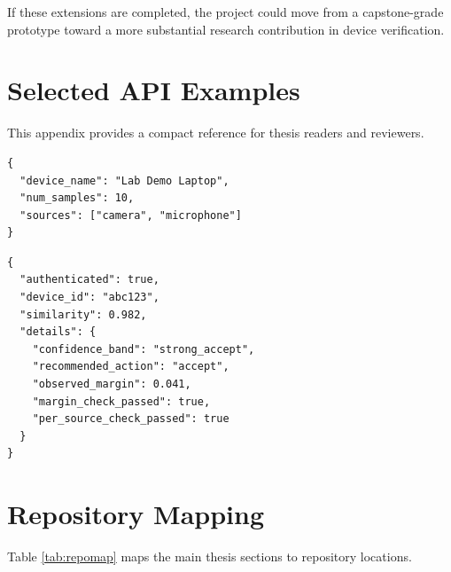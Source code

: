\documentclass[12pt]{report}
\begin{document}
If these extensions are completed, the project could move from a capstone-grade prototype toward a more substantial research contribution in device verification.

\appendix

\chapter{Selected API Examples}
This appendix provides a compact reference for thesis readers and reviewers.

\begin{lstlisting}[language={},caption={Enrollment request example}]
{
  "device_name": "Lab Demo Laptop",
  "num_samples": 10,
  "sources": ["camera", "microphone"]
}
\end{lstlisting}

\begin{lstlisting}[language={},caption={Authentication response example with diagnostics}]
{
  "authenticated": true,
  "device_id": "abc123",
  "similarity": 0.982,
  "details": {
    "confidence_band": "strong_accept",
    "recommended_action": "accept",
    "observed_margin": 0.041,
    "margin_check_passed": true,
    "per_source_check_passed": true
  }
}
\end{lstlisting}

\chapter{Repository Mapping}
Table \ref{tab:repomap} maps the main thesis sections to repository locations.
\end{document}
